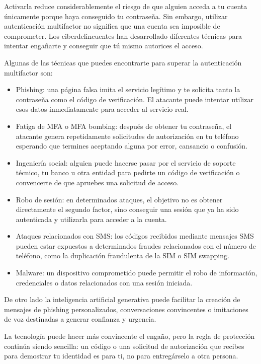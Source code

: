 \documentclass[
  spanish,
  a4paper,
  openany]{book}
\begin{document}
Activarla reduce considerablemente el riesgo de que alguien acceda a tu cuenta únicamente porque haya conseguido tu contraseña. Sin embargo, utilizar autenticación multifactor no significa que una cuenta sea imposible de comprometer. Los ciberdelincuentes han desarrollado diferentes técnicas para intentar engañarte y conseguir que tú mismo autorices el acceso.

Algunas de las técnicas que puedes encontrarte para superar la autenticación multifactor son:

\begin{itemize}
\item
  Phishing: una página falsa imita el servicio legítimo y te solicita tanto la contraseña como el código de verificación. El atacante puede intentar utilizar esos datos inmediatamente para acceder al servicio real.
\item
  Fatiga de MFA o MFA bombing: después de obtener tu contraseña, el atacante genera repetidamente solicitudes de autorización en tu teléfono esperando que termines aceptando alguna por error, cansancio o confusión.
\item
  Ingeniería social: alguien puede hacerse pasar por el servicio de soporte técnico, tu banco u otra entidad para pedirte un código de verificación o convencerte de que apruebes una solicitud de acceso.
\item
  Robo de sesión: en determinados ataques, el objetivo no es obtener directamente el segundo factor, sino conseguir una sesión que ya ha sido autenticada y utilizarla para acceder a la cuenta.
\item
  Ataques relacionados con SMS: los códigos recibidos mediante mensajes SMS pueden estar expuestos a determinados fraudes relacionados con el número de teléfono, como la duplicación fraudulenta de la SIM o SIM swapping.
\item
  Malware: un dispositivo comprometido puede permitir el robo de información, credenciales o datos relacionados con una sesión iniciada.
\end{itemize}

De otro lado la inteligencia artificial generativa puede facilitar la creación de mensajes de phishing personalizados, conversaciones convincentes o imitaciones de voz destinadas a generar confianza y urgencia.

La tecnología puede hacer más convincente el engaño, pero la regla de protección continúa siendo sencilla: un código o una solicitud de autorización que recibes para demostrar tu identidad es para ti, no para entregárselo a otra persona.
\end{document}
